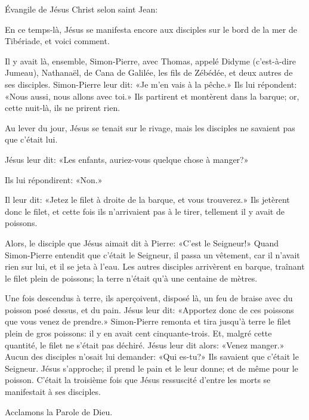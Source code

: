 \indent{} Évangile de Jésus Christ selon saint Jean:

En ce temps-là, Jésus se manifesta encore aux disciples sur le bord de la mer de Tibériade, et voici comment.

Il y avait là, ensemble, Simon-Pierre, avec Thomas, appelé Didyme (c’est-à-dire Jumeau), Nathanaël, de Cana de Galilée, les fils de Zébédée, et deux autres de ses disciples. Simon-Pierre leur dit: «Je m’en vais à la pêche.» Ils lui répondent: «Nous aussi, nous allons avec toi.» Ils partirent et montèrent dans la barque; or, cette nuit-là, ils ne prirent rien.

Au lever du jour, Jésus se tenait sur le rivage, mais les disciples ne savaient pas que c’était lui.

Jésus leur dit: «Les enfants, auriez-vous quelque chose à manger?»

Ils lui répondirent: «Non.»

Il leur dit: «Jetez le filet à droite de la barque, et vous trouverez.» Ils jetèrent donc le filet, et cette fois ils n’arrivaient pas à le tirer, tellement il y avait de poissons.

Alors, le disciple que Jésus aimait dit à Pierre: «C’est le Seigneur!» Quand Simon-Pierre entendit que c’était le Seigneur, il passa un vêtement, car il n’avait rien sur lui, et il se jeta à l’eau. Les autres disciples arrivèrent en barque, traînant le filet plein de poissons; la terre n’était qu’à une centaine de mètres.

Une fois descendus à terre, ils aperçoivent, disposé là, un feu de braise avec du poisson posé dessus, et du pain. Jésus leur dit: «Apportez donc de ces poissons que vous venez de prendre.» Simon-Pierre remonta et tira jusqu’à terre le filet plein de gros poissons: il y en avait cent cinquante-trois. Et, malgré cette quantité, le filet ne s’était pas déchiré. Jésus leur dit alors: «Venez manger.» Aucun des disciples n’osait lui demander: «Qui es-tu?» Ils savaient que c’était le Seigneur. Jésus s’approche; il prend le pain et le leur donne; et de même pour le poisson. C’était la troisième fois que Jésus ressuscité d’entre les morts se manifestait à ses disciples.

Acclamons la Parole de Dieu.